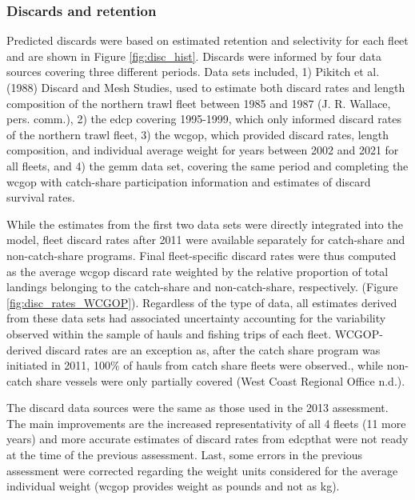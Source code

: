 \documentclass[11pt,
  english,
  letterpaper,
]{article}
\begin{document}
\hypertarget{discards-and-retention}{%
\subsubsection{Discards and retention}\label{discards-and-retention}}

Predicted discards were based on estimated retention and selectivity for each fleet and are shown in Figure \ref{fig:disc_hist}. Discards were informed by four data sources covering three different periods. Data sets included, 1) Pikitch et al. (1988) Discard and Mesh Studies, used to estimate both discard rates and length composition of the northern trawl fleet between 1985 and 1987 (J. R. Wallace, pers. comm.), 2) the \gls{edcp} covering 1995-1999, which only informed discard rates of the northern trawl fleet, 3) the \gls{wcgop}, which provided discard rates, length composition, and individual average weight for years between 2002 and 2021 for all fleets, and 4) the \gls{gemm} data set, covering the same period and completing the \gls{wcgop} with catch-share participation information and estimates of discard survival rates.

While the estimates from the first two data sets were directly integrated into the model, fleet discard rates after 2011 were available separately for catch-share and non-catch-share programs. Final fleet-specific discard rates were thus computed as the average \gls{wcgop} discard rate weighted by the relative proportion of total landings belonging to the catch-share and non-catch-share, respectively. (Figure \ref{fig:disc_rates_WCGOP}). Regardless of the type of data, all estimates derived from these data sets had associated uncertainty accounting for the variability observed within the sample of hauls and fishing trips of each fleet. WCGOP-derived discard rates are an exception as, after the catch share program was initiated in 2011, 100\% of hauls from catch share fleets were observed., while non-catch share vessels were only partially covered (West Coast Regional Office n.d.).

The discard data sources were the same as those used in the 2013 assessment. The main improvements are the increased representativity of all 4 fleets (11 more years) and more accurate estimates of discard rates from \gls{edcp}that were not ready at the time of the previous assessment. Last, some errors in the previous assessment were corrected regarding the weight units considered for the average individual weight (\gls{wcgop} provides weight as pounds and not as kg).
\end{document}
